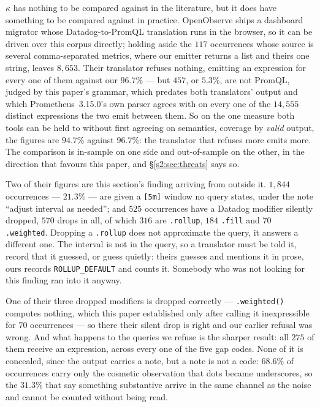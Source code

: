$\kappa$ has nothing to be compared against in the literature, but it does have something
to be compared against in practice. OpenObserve ships a dashboard migrator whose
Datadog-to-PromQL translation runs in the browser, so it can be driven over this corpus
directly; holding aside the $117$ occurrences whose source is several comma-separated
metrics, where our emitter returns a list and theirs one string, leaves $8{,}653$. Their
translator refuses nothing, emitting an expression for every one of them against our
$96.7\%$ --- but $457$, or $5.3\%$, are not PromQL, judged by this paper's grammar, which
predates both translators' output and which Prometheus~3.15.0's own parser agrees with on
every one of the $14{,}555$ distinct expressions the two emit between them. So on the one
measure both tools can be held to without first agreeing on semantics, coverage by
\emph{valid} output, the figures are $94.7\%$ against $96.7\%$: the translator that refuses
more emits more. The comparison is in-sample on one side and out-of-sample on the other, in
the direction that favours this paper, and \S\ref{s2:sec:threats} says so.

Two of their figures are this section's finding arriving from outside it. $1{,}844$
occurrences --- $21.3\%$ --- are given a \texttt{[5m]} window no query states, under the
note ``adjust interval as needed''; and $525$ occurrences have a Datadog modifier silently
dropped, $570$ drops in all, of which $316$ are \texttt{.rollup}, $184$ \texttt{.fill} and
$70$ \texttt{.weighted}. Dropping a \texttt{.rollup} does not approximate the query, it
answers a different one. The interval is not in the query, so a translator must be told it,
record that it guessed, or guess quietly: theirs guesses and mentions it in prose, ours
records \texttt{ROLLUP\_DEFAULT} and counts it. Somebody who was not looking for this
finding ran into it anyway.

One of their three dropped modifiers is dropped correctly --- \texttt{.weighted()} computes
nothing, which this paper established only after calling it inexpressible for $70$
occurrences --- so there their silent drop is right and our earlier refusal was wrong. And
what happens to the queries we refuse is the sharper result: all $275$ of them receive an
expression, across every one of the five gap codes. None of it is concealed, since the
output carries a note, but a note is not a code: $68.6\%$ of occurrences carry only the
cosmetic observation that dots became underscores, so the $31.3\%$ that say something
substantive arrive in the same channel as the noise and cannot be counted without being
read.

